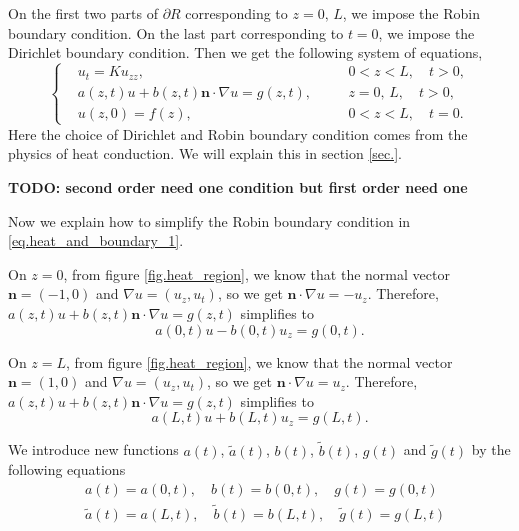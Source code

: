 On the first two parts of $\partial R$ corresponding to $z = 0,\, L$, we impose the Robin boundary condition. On the last part corresponding to $t = 0$, we impose the Dirichlet boundary condition. Then we get the following system of equations,
\begin{equation}\label{eq.heat_and_boundary_1}
    \left\{\begin{aligned} 
        &u_t=K u_{z z}, && 0<z<L, \quad t>0, 
        \\ 
        &a(z, t) u+b(z, t) \mathbf{n} \cdot \nabla u=g(z, t),\quad && z=0,\, L, \quad t>0, 
        \\
        &u(z, 0)=f(z), && 0<z<L, \quad t=0.
    \end{aligned}\right.
\end{equation}
Here the choice of Dirichlet and Robin boundary condition comes from the physics of heat conduction. We will explain this in section \ref{sec.}.

\textbf{TODO: second order need one condition but first order need one}


Now we explain how to simplify the Robin boundary condition in \eqref{eq.heat_and_boundary_1}.

On $z = 0$, from figure \ref{fig.heat_region}, we know that the normal vector $\mathbf{n} = (-1, 0)$ and $\nabla u = (u_z, u_t)$, so we get $\mathbf{n}\cdot \nabla u = -u_z$. Therefore, $a(z, t) u+b(z, t) \mathbf{n} \cdot \nabla u=g(z, t)$ simplifies to 
\begin{equation}\label{eq.heat_and_boundary_2}
    a(0, t) u - b(0, t) u_z = g(0, t).
\end{equation}

On $z = L$, from figure \ref{fig.heat_region}, we know that the normal vector $\mathbf{n} = (1, 0)$ and $\nabla u = (u_z, u_t)$, so we get $\mathbf{n}\cdot \nabla u = u_z$. Therefore, $a(z, t) u+b(z, t) \mathbf{n} \cdot \nabla u=g(z, t)$ simplifies to 
\begin{equation}\label{eq.heat_and_boundary_3}
    a(L, t) u + b(L, t) u_z = g(L, t).
\end{equation}

We introduce new functions $a(t)$, $\widetilde{a}(t)$, $b(t)$, $\widetilde{b}(t)$, $g(t)$ and $\widetilde{g}(t)$ by the following equations
\begin{equation}\label{eq.heat_and_boundary_4}
    \begin{split}
        &a(t) = a(0, t),\quad b(t) = b(0, t),\quad g(t) = g(0, t)
        \\
        &\widetilde{a}(t) = a(L, t),\quad \widetilde{b}(t) = b(L, t),\quad \widetilde{g}(t) = g(L, t)
    \end{split}
\end{equation}

